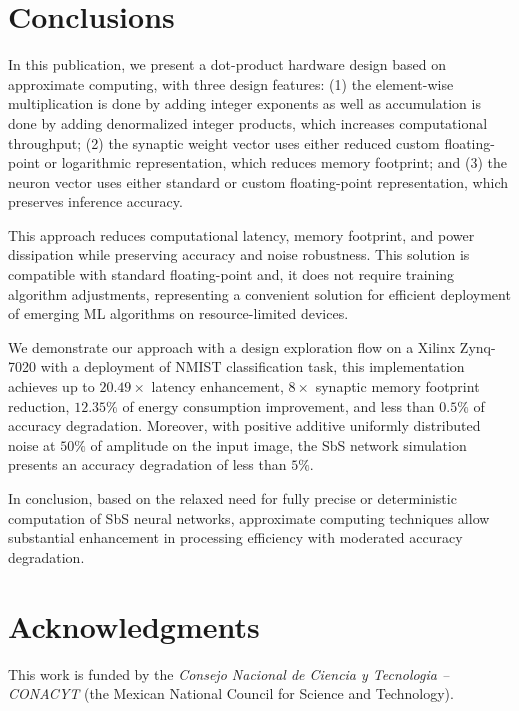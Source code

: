\section{Conclusions}
\label{sec:conclusions}

In this publication, we present a dot-product hardware design based on approximate computing, with three design features: (1) the element-wise multiplication is done by adding integer exponents as well as accumulation is done by adding denormalized integer products, which increases computational throughput; (2) the synaptic weight vector uses either reduced custom floating-point or logarithmic representation, which reduces memory footprint; and (3) the neuron vector uses either standard or custom floating-point representation, which preserves inference accuracy.

This approach reduces computational latency, memory footprint, and power dissipation while preserving accuracy and noise robustness. This solution is compatible with standard floating-point and, it does not require training algorithm adjustments, representing a convenient solution for efficient deployment of emerging ML algorithms on resource-limited devices.

We demonstrate our approach with a design exploration flow on a Xilinx Zynq-7020 with a deployment of NMIST classification task, this implementation achieves up to $20.49\times$ latency enhancement, $8\times$ synaptic memory footprint reduction, $12.35\%$ of energy consumption improvement, and less than $0.5\%$ of accuracy degradation. Moreover, with positive additive uniformly distributed noise at $50\%$ of amplitude on the input image, the SbS network simulation presents an accuracy degradation of less than $5\%$.

In conclusion, based on the relaxed need for fully precise or deterministic computation of SbS neural networks, approximate computing techniques allow substantial enhancement in processing efficiency with moderated accuracy degradation.

\section * {Acknowledgments}\label{sec:Ack}
This work is funded by the \textit{Consejo Nacional de Ciencia y Tecnologia -- CONACYT} (the Mexican National Council for Science and Technology).
